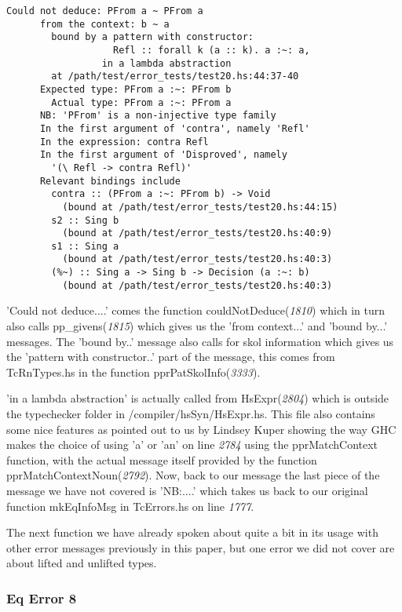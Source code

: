 \documentclass[a4paper]{article}
\begin{document}
\begin{lstlisting}[label={lst: T13.0.2}, numbers=none, caption={Error}]
Could not deduce: PFrom a ~ PFrom a
      from the context: b ~ a
        bound by a pattern with constructor:
                   Refl :: forall k (a :: k). a :~: a,
                 in a lambda abstraction
        at /path/test/error_tests/test20.hs:44:37-40
      Expected type: PFrom a :~: PFrom b
        Actual type: PFrom a :~: PFrom a
      NB: 'PFrom' is a non-injective type family
      In the first argument of 'contra', namely 'Refl'
      In the expression: contra Refl
      In the first argument of 'Disproved', namely
        '(\ Refl -> contra Refl)'
      Relevant bindings include
        contra :: (PFrom a :~: PFrom b) -> Void
          (bound at /path/test/error_tests/test20.hs:44:15)
        s2 :: Sing b
          (bound at /path/test/error_tests/test20.hs:40:9)
        s1 :: Sing a
          (bound at /path/test/error_tests/test20.hs:40:3)
        (%~) :: Sing a -> Sing b -> Decision (a :~: b)
          (bound at /path/test/error_tests/test20.hs:40:3)
\end{lstlisting}

'Could not deduce....' comes the function couldNotDeduce(\textit{1810}) which in turn also calls pp\_givens(\textit{1815}) which gives us the 'from context...' and 'bound by...' messages. The 'bound by..' message also calls for skol information which gives us the 'pattern with constructor..' part of the message, this comes from TcRnTypes.hs in the function pprPatSkolInfo(\textit{3333}). 

'in a lambda abstraction' is actually called from HsExpr(\textit{2804}) which is outside the typechecker folder in /compiler/hsSyn/HsExpr.hs. This file also contains some nice features as pointed out to us by Lindsey Kuper \cite{twitter1} showing the way GHC makes the choice of using 'a' or 'an' on line \textit{2784} using the pprMatchContext function, with the actual message itself provided by the function pprMatchContextNoun(\textit{2792}). Now, back to our message the last piece of the message we have not covered is 'NB:....' which takes us back to our original function mkEqInfoMsg in TcErrors.hs on line \textit{1777}.

The next function we have already spoken about quite a bit in its usage with other error messages previously in this paper, but one error we did not cover are about lifted and unlifted types.

\subsubsection{Eq Error 8}
\end{document}
